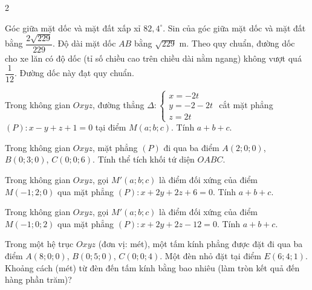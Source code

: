 \begin{deontap}{2}
\begin{cau}
\begin{dungsai}
  \y Góc giữa mặt dốc và mặt đất xấp xỉ $82{,}4^\circ$. \oDS
  \y Sin của góc giữa mặt dốc và mặt đất bằng $\dfrac{2 \sqrt{229}}{229}$. \oDS
  \y Độ dài mặt dốc $AB$ bằng $\sqrt{229}$ m. \oDS
  \y Theo quy chuẩn, đường dốc cho xe lăn có độ dốc (tỉ số chiều cao trên chiều dài nằm ngang) không vượt quá $\dfrac{1}{12}$. Đường dốc này đạt quy chuẩn. \oDS
\end{dungsai}
\end{cau}
\phanIII
\begin{cau}Trong không gian $Oxyz$, đường thẳng $\Delta\colon \begin{cases}x=-2t\\y=-2-2t\\z=2t\end{cases}$ cắt mặt phẳng $(P)\colon x-y+z+1=0$ tại điểm $M(a;b;c)$. Tính $a+b+c$.\otraloi
{}\end{cau}
\begin{cau}Trong không gian $Oxyz$, mặt phẳng $(P)$ đi qua ba điểm $A(2;0;0)$, $B(0;3;0)$, $C(0;0;6)$. Tính thể tích khối tứ diện $OABC$.\otraloi
{}\end{cau}
\begin{cau}Trong không gian $Oxyz$, gọi $M'(a;b;c)$ là điểm đối xứng của điểm $M(-1;2;0)$ qua mặt phẳng $(P)\colon x+2y+2z+6=0$. Tính $a+b+c$.\otraloi
{}\end{cau}
\begin{cau}Trong không gian $Oxyz$, gọi $M'(a;b;c)$ là điểm đối xứng của điểm $M(-1;0;2)$ qua mặt phẳng $(P)\colon x+2y+2z-12=0$. Tính $a+b+c$.\otraloi
{}\end{cau}
\begin{cau}Trong một hệ trục $Oxyz$ (đơn vị: mét), một tấm kính phẳng được đặt đi qua ba điểm $A(8;0;0)$, $B(0;5;0)$, $C(0;0;4)$. Một đèn nhỏ đặt tại điểm $E(6;4;1)$. Khoảng cách (mét) từ đèn đến tấm kính bằng bao nhiêu (làm tròn kết quả đến hàng phần trăm)?
\end{cau}
\end{deontap}
